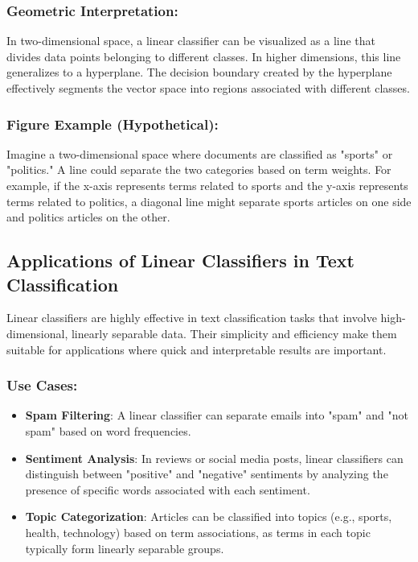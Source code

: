 \documentclass{article}
\begin{document}
\subsubsection*{Geometric Interpretation:}
In two-dimensional space, a linear classifier can be visualized as a line that divides data points belonging to different classes. In higher dimensions, this line generalizes to a hyperplane. The decision boundary created by the hyperplane effectively segments the vector space into regions associated with different classes.

\subsubsection*{Figure Example (Hypothetical):}
Imagine a two-dimensional space where documents are classified as "sports" or "politics." A line could separate the two categories based on term weights. For example, if the x-axis represents terms related to sports and the y-axis represents terms related to politics, a diagonal line might separate sports articles on one side and politics articles on the other.

\subsection{Applications of Linear Classifiers in Text Classification}

Linear classifiers are highly effective in text classification tasks that involve high-dimensional, linearly separable data. Their simplicity and efficiency make them suitable for applications where quick and interpretable results are important.

\subsubsection*{Use Cases:}
\begin{itemize}
    \item \textbf{Spam Filtering}: A linear classifier can separate emails into "spam" and "not spam" based on word frequencies.
    \item \textbf{Sentiment Analysis}: In reviews or social media posts, linear classifiers can distinguish between "positive" and "negative" sentiments by analyzing the presence of specific words associated with each sentiment.
    \item \textbf{Topic Categorization}: Articles can be classified into topics (e.g., sports, health, technology) based on term associations, as terms in each topic typically form linearly separable groups.
\end{itemize}
\end{document}
